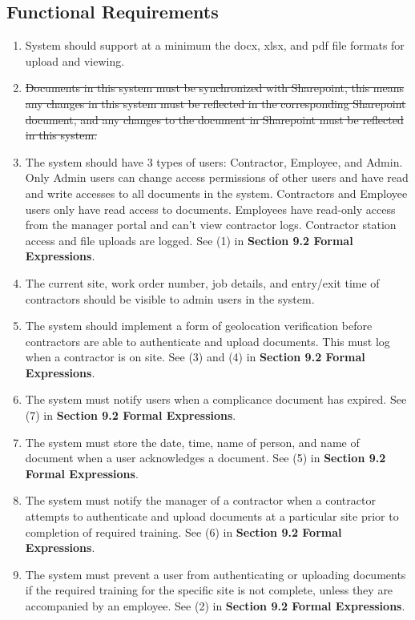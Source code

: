 \documentclass[12pt]{article}
\begin{document}
\subsection{Functional Requirements}
\begin{enumerate} [{FR}1.]
  \item System should support at a minimum the docx, xlsx, and pdf
    file formats for upload and viewing.
  \item \sout{Documents in this system must be synchronized with
      Sharepoint, this means any changes in this system must be
      reflected in the corresponding Sharepoint document, and any
    changes to the document in Sharepoint must be reflected in this system.}
  \item The system should have 3 types of users: Contractor, Employee, and Admin. 
    Only Admin users can change
    access permissions of other users and have read and write
    accesses to all documents in the system. Contractors and Employee
    users only have read access to documents. Employees have read-only access from the manager portal
    and can't view contractor logs. Contractor station access and file uploads are logged.
    See (1) in \textbf{Section 9.2 Formal Expressions}.
  \item The current site, work order number, job details, and entry/exit time of
    contractors should be visible to admin users in the system.
  \item The system should implement a form of geolocation verification before
    contractors are able to authenticate and upload documents. This must log when a contractor is on site. See (3) and
    (4) in \textbf{Section 9.2 Formal Expressions}.
  \item The system must notify users when a complicance document has expired.
    See (7) in \textbf{Section 9.2 Formal Expressions}.
  \item The system must store the date, time, name of person, and name of
    document when a user acknowledges a document. See (5) in
    \textbf{Section 9.2 Formal Expressions}.
  \item The system must notify the manager of a contractor when a contractor
    attempts to authenticate and upload documents at a particular site prior to
    completion of required training. See (6) in
    \textbf{Section 9.2 Formal Expressions}.
  \item The system must prevent a user from authenticating or uploading
    documents if the required training for the specific site is not complete, unless they are accompanied by an employee.
    See (2) in \textbf{Section 9.2 Formal Expressions}.

\end{enumerate}
\end{document}
